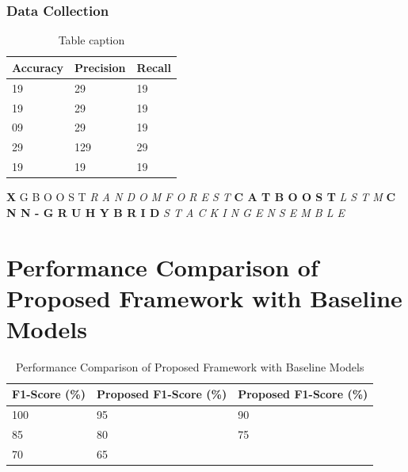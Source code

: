 \documentclass[twocolumn]{svjour3}
\begin{document}
\subsubsection{Data Collection}
\begin{table}
\centering
\caption{Table caption}
\begin{tabular}{lll}
\hline
Accuracy & Precision & Recall \\
\hline
19 & 29 & 19 \\
19 & 29 & 19 \\
09 & 29 & 19 \\
29 & 129 & 29 \\
19 & 19 & 19 \\
\hline
\end{tabular}
\end{table}
\textbf{X} G B O O S T \cite{11}
\textit{R A N D O M F O R E S T} \cite{21, 22}
\textbf{C A T B O O S T} \cite{17, 18}
\textit{L S T M} \cite{16}
\textbf{C N N - G R U H Y B R I D} \cite{13}
\textit{S T A C K I N G E N S E M B L E} \cite{23}

\section{Performance Comparison of Proposed Framework with Baseline Models}
\begin{table}
\centering
\caption{Performance Comparison of Proposed Framework with Baseline Models}
\begin{tabular}{lll}
\hline
F1-Score (\%) & Proposed F1-Score (\%) & Proposed F1-Score (\%) \\
\hline
100 & 95 & 90 \\
85 & 80 & 75 \\
70 & 65 & \\
\hline
\end{tabular}
\end{table}
\end{document}
